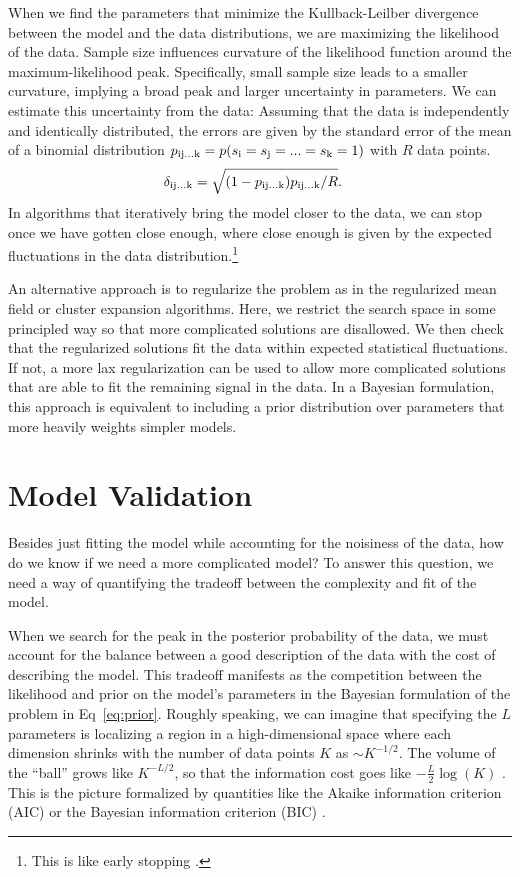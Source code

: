 \documentclass[aps,prl,twocolumn,nofootinbib]{revtex4-1}
\begin{document}
When we find the parameters that minimize the Kullback-Leilber divergence between the model and the data distributions, we are maximizing the likelihood of the data. 
Sample size influences curvature of the likelihood function around the maximum-likelihood peak.  Specifically, small sample size leads to a smaller curvature, implying a broad peak and larger uncertainty in parameters.
We can estimate this uncertainty from the data: Assuming that the data is independently and identically distributed, the errors are given by the standard error of the mean of a binomial distribution \mbox{$p_{\rm ij...k} = p(s_{\rm i}=s_{\rm j}=...=s_{\rm k}=1)$} with $R$ data points.
\begin{align}
	\delta_{\rm ij...k} &= \sqrt{(1-p_{\rm ij...k})p_{\rm ij...k}/R}.
\end{align}
In algorithms that iteratively bring the model closer to the data, we can stop once we have gotten close enough, where close enough is given by the expected fluctuations in the data distribution.\footnote{This is like early stopping \cite{}.}

An alternative approach is to regularize the problem as in the regularized mean field or cluster expansion algorithms. Here, we restrict the search space in some principled way so that more complicated
solutions are disallowed.  We then check that the regularized solutions fit the
data within expected statistical fluctuations.  If not, a more lax regularization
can be used to allow more complicated solutions that are able to fit the
remaining signal in the data. 
In a Bayesian formulation, this approach is equivalent to including a prior distribution over  parameters that more heavily weights simpler models.

\section{Model Validation}
Besides just fitting the model while accounting for the noisiness of the data, how do we know if we need a more complicated model? To answer this question, we need a way of quantifying the tradeoff between the complexity and fit of the model. 

When we search for the peak in the posterior probability of the data, we must account for the balance between a good description of the data with the cost of describing the model. This tradeoff manifests as the competition between the likelihood and prior on the model's parameters in the Bayesian formulation of the problem in Eq~\ref{eq:prior}. Roughly speaking, we can imagine that specifying the $L$ parameters is localizing a region in a high-dimensional space where each dimension shrinks with the number of data points $K$ as $\sim K^{-1/2}$. The volume of the ``ball'' grows like $K^{-L/2}$, so that the information cost goes like $-\frac{L}{2}\log(K)$ \cite{Lee:2015ev}. This is the picture formalized by quantities like the Akaike information criterion (AIC) or the Bayesian information criterion (BIC) \cite{Anonymous:mVL3xTtr}.
\end{document}
